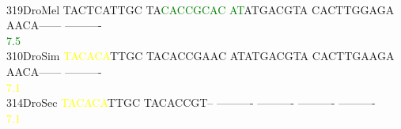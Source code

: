 \documentclass[11pt,twoside,reqno,a4paper]{article}
\begin{document}
{\\
319\hspace*{2\charwidth}DroMel	TACTCATTGC	TA\textcolor{Green}{C}\textcolor{Green}{A}\textcolor{Green}{C}\textcolor{Green}{C}\textcolor{Green}{G}\textcolor{Green}{C}\textcolor{Green}{A}\textcolor{Green}{C}	\textcolor{Green}{A}\textcolor{Green}{T}ATGACGTA	CACTTGGAGA	AACA------	----------	\\
\hspace*{5\charwidth}\hspace*{7\charwidth}\hspace*{1\charwidth}\hspace*{12\charwidth}\textcolor{Green}{7.5}\hspace*{1\charwidth}\hspace*{1\charwidth}\hspace*{1\charwidth}\hspace*{1\charwidth}\hspace*{1\charwidth}\\
310\hspace*{2\charwidth}DroSim	\textcolor{Yellow}{T}\textcolor{Yellow}{A}\textcolor{Yellow}{C}\textcolor{Yellow}{A}\textcolor{Yellow}{C}\textcolor{Yellow}{A}TTGC	TACACCGAAC	ATATGACGTA	CACTTGAAGA	AACA------	----------	\\
\hspace*{5\charwidth}\hspace*{7\charwidth}\hspace*{0\charwidth}\textcolor{Yellow}{7.1}\hspace*{1\charwidth}\hspace*{1\charwidth}\hspace*{1\charwidth}\hspace*{1\charwidth}\hspace*{1\charwidth}\hspace*{1\charwidth}\\
314\hspace*{2\charwidth}DroSec	\textcolor{Yellow}{T}\textcolor{Yellow}{A}\textcolor{Yellow}{C}\textcolor{Yellow}{A}\textcolor{Yellow}{C}\textcolor{Yellow}{A}TTGC	TACACCGT--	----------	----------	----------	----------	\\
\hspace*{5\charwidth}\hspace*{7\charwidth}\hspace*{0\charwidth}\textcolor{Yellow}{7.1}\hspace*{1\charwidth}\hspace*{1\charwidth}\hspace*{1\charwidth}\hspace*{1\charwidth}\hspace*{1\charwidth}\hspace*{1\charwidth}\\
}
\end{document}
